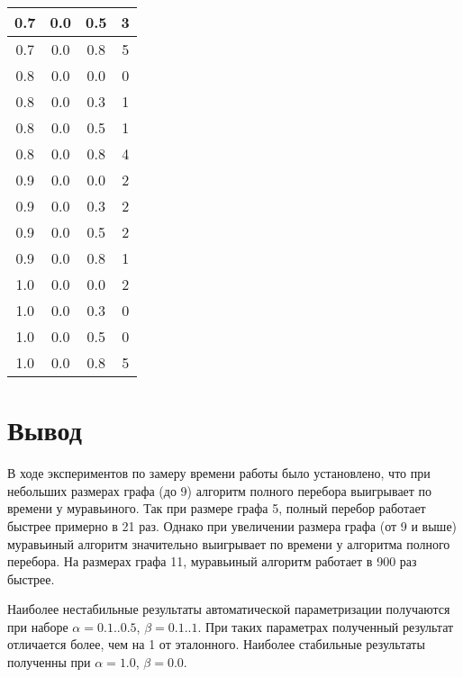 \begin{longtable}[c]{|c|c|c|c|}
        0.7      & 0.0     & 0.5    & 3       \\ \hline
        0.7      & 0.0     & 0.8    & 5       \\ \hline
        0.8      & 0.0     & 0.0    & 0       \\ \hline
        0.8      & 0.0     & 0.3    & 1       \\ \hline
        0.8      & 0.0     & 0.5    & 1       \\ \hline
        0.8      & 0.0     & 0.8    & 4       \\ \hline
        0.9      & 0.0     & 0.0    & 2       \\ \hline
        0.9      & 0.0     & 0.3    & 2       \\ \hline
        0.9      & 0.0     & 0.5    & 2       \\ \hline
        0.9      & 0.0     & 0.8    & 1       \\ \hline
        1.0      & 0.0     & 0.0    & 2       \\ \hline
        1.0      & 0.0     & 0.3    & 0       \\ \hline
        1.0      & 0.0     & 0.5    & 0       \\ \hline
        1.0      & 0.0     & 0.8    & 5       \\ \hline
    \end{longtable}

    \section{Вывод}
        В ходе экспериментов по замеру времени работы было установлено, что 
        при небольших размерах графа (до 9) алгоритм полного перебора 
        выигрывает по времени у муравьиного. 
        Так при размере графа 5, полный перебор работает быстрее примерно в 21 раз.
        Однако при увеличении размера графа (от 9 и выше) муравьиный алгоритм 
        значительно выигрывает по времени у алгоритма полного перебора.
        На размерах графа 11, муравьиный алгоритм работает в 900 раз быстрее.

        Наиболее нестабильные результаты автоматической параметризации получаются
        при наборе $\alpha = 0.1..0.5$, $\beta = 0.1..1$. 
        При таких параметрах полученный результат отличается более, чем на 1 от эталонного.
        Наиболее стабильные результаты полученны при $\alpha = 1.0$, $\beta = 0.0$.

\newpage